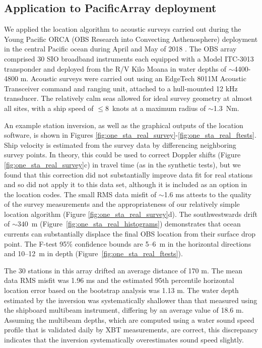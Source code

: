 \subsection{Application to PacificArray deployment}
We applied the location algorithm to acoustic surveys carried out during the Young Pacific ORCA (OBS Research into Convecting Asthenosphere) deployment in the central Pacific ocean during April and May of 2018 \citep{Gaherty2018}. The OBS array comprised 30 SIO broadband instruments each equipped with a Model ITC-3013 transponder and deployed from the R/V Kilo Moana in water depths of $\sim$4400-4800 m. Acoustic  surveys were carried out using an EdgeTech 8011M Acoustic Transceiver command and ranging unit, attached to a hull-mounted 12 kHz transducer. The relatively calm seas allowed for ideal survey geometry at almost all sites, with a ship speed of \mbox{$\le$8 knots} at a maximum radius of \mbox{$\sim$1.3 Nm}. 

An example station inversion, as well as the graphical outputs of the location software, is shown in Figures \ref{fig:one_sta_real_survey}-\ref{fig:one_sta_real_ftests}. Ship velocity is estimated from the survey data by differencing neighboring survey points. In theory, this could be used to correct Doppler shifts (Figure \ref{fig:one_sta_real_survey}c) in travel time (as in the synthetic tests), but we found that this correction did not substantially improve data fit for real stations and so did not apply it to this data set, although it is included as an option in the location codes. The small RMS data misfit of $\sim$1.6 ms attests to the quality of the survey measurements and the appropriateness of our relatively simple location algorithm (Figure \ref{fig:one_sta_real_survey}d). The southwestwards drift of \mbox{$\sim340$ m} (Figure~\ref{fig:one_sta_real_histograms}) demonstrates that ocean currents can substantially displace the final OBS location from their surface drop point. The F-test 95\% confidence bounds are 5--6~m in the horizontal directions and 10--12~m in depth (Figure~\ref{fig:one_sta_real_ftests}).

The 30 stations in this array drifted an average distance of 170 m. The mean data RMS misfit was 1.96 ms and the estimated 95th percentile horizontal location error based on the bootstrap analysis was 1.13 m. The water depth estimated by the inversion was systematically shallower than that measured using the shipboard multibeam instrument, differing by an average value of 18.6 m. Assuming the multibeam depths, which are computed using a water sound speed profile that is validated daily by XBT measurements, are correct, this discrepancy indicates that the inversion systematically overestimates sound speed slightly. 

